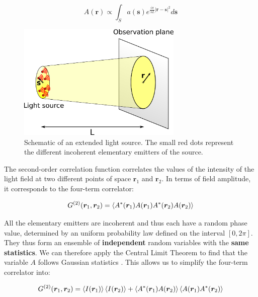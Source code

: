 \begin{equation}
    A(\bm{r}) \propto \int_{S} a(\bm{s}) e^{\frac{i \pi}{\lambda L}|\bm{r}-\bm{s}|^{2}} d \bm{s}
    \label{eq:amp_HBT}
\end{equation}

\begin{figure}
    \centering
    \includegraphics[width=0.7\textwidth]{Fig/Chapter1/source_and_plane.png}
    \caption{Schematic of an extended light source. The small red dots represent the different incoherent elementary emitters of the source.}
    \label{fig:source_and_plane}
\end{figure}

The second-order correlation function correlates the values of the intensity of the light field at two different points of space $\bm{r}_1$ and $\bm{r}_2$. In terms of field amplitude, it corresponds to the four-term correlator:

\begin{equation}
    G^{(2)} (\bm{r}_1,\bm{r}_2) = \left\langle A^*(\bm{r}_1) A(\bm{r}_1) A^*(\bm{r}_2) A(\bm{r}_2)\right\rangle
\end{equation}

\noindent All the elementary emitters are incoherent and thus each have a random phase value, determined by an uniform probability law defined on the interval $[0,2\pi]$. They thus form an ensemble of \textbf{independent} random variables with the \textbf{same statistics}. We can therefore apply the Central Limit Theorem to find that the variable $A$ follows Gaussian statistics \cite{goodman2007speckle}. This allows us to simplify the four-term correlator into:

\begin{equation}
     G^{(2)} (\bm{r}_1,\bm{r}_2) = \left\langle I(\bm{r}_1)\right\rangle \left\langle I(\bm{r}_2)\right\rangle + \left\langle A^*(\bm{r}_1) A(\bm{r}_2)\right\rangle \left\langle A(\bm{r}_1) A^*(\bm{r}_2)\right\rangle
\end{equation}

